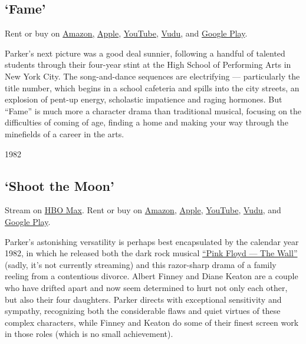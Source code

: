 \hypertarget{fame}{%
\subsection{`Fame'}\label{fame}}

Rent or buy on
\href{https://www.amazon.com/gp/video/detail/B000I0TJS6/ref=atv_dp_share_cu_r}{Amazon,}
\href{https://itunes.apple.com/us/movie/fame-the-original-movie/id300148471?ign-mpt=uo\%3D4}{Apple},
\href{https://www.youtube.com/watch?v=qT6lQfPJNkg}{YouTube},
\href{https://www.vudu.com/content/movies/details/Fame/9799}{Vudu}, and
\href{https://play.google.com/store/movies/details/Fame_1980?gl=US\&hl=en\&id=qT6lQfPJNkg\&PAffiliateID=110l4uj}{Google
Play}.

Parker's next picture was a good deal sunnier, following a handful of
talented students through their four-year stint at the High School of
Performing Arts in New York City. The song-and-dance sequences are
electrifying --- particularly the title number, which begins in a school
cafeteria and spills into the city streets, an explosion of pent-up
energy, scholastic impatience and raging hormones. But ``Fame'' is much
more a character drama than traditional musical, focusing on the
difficulties of coming of age, finding a home and making your way
through the minefields of a career in the arts.

1982

\hypertarget{shoot-the-moon}{%
\subsection{`Shoot the Moon'}\label{shoot-the-moon}}

Stream on
\href{https://play.hbomax.com/feature/urn:hbo:feature:GXjS6EA5wtZPCwgEAAASK}{HBO
Max}. Rent or buy on
\href{https://www.amazon.com/gp/video/detail/B075KPDXRC/ref=atv_dp_share_cu_r}{Amazon},
\href{https://itunes.apple.com/us/movie/shoot-the-moon-1982/id375229530?ign-mpt=uo\%3D4}{Apple},
\href{https://www.youtube.com/watch?v=19iEElPi5wk}{YouTube},
\href{https://www.vudu.com/content/movies/details/Shoot-the-Moon/94862}{Vudu},
and
\href{https://play.google.com/store/movies/details/Shoot_the_Moon?gl=US\&hl=en\&id=19iEElPi5wk\&PAffiliateID=110l4uj}{Google
Play}.

Parker's astonishing versatility is perhaps best encapsulated by the
calendar year 1982, in which he released both the dark rock musical
\href{https://www.youtube.com/watch?v=TPTLIVPqThY}{``Pink Floyd --- The
Wall''} (sadly, it's not currently streaming) and this razor-sharp drama
of a family reeling from a contentious divorce. Albert Finney and Diane
Keaton are a couple who have drifted apart and now seem determined to
hurt not only each other, but also their four daughters. Parker directs
with exceptional sensitivity and sympathy, recognizing both the
considerable flaws and quiet virtues of these complex characters, while
Finney and Keaton do some of their finest screen work in those roles
(which is no small achievement).

